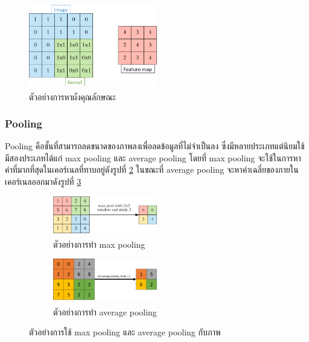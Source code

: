 \begin{figure}[!ht]
	\centering
	\includegraphics[width=0.5\textwidth]{chapter2/images/feature_map.png}
		\caption[ตัวอย่างการหาผังคุณลักษณะ]{ตัวอย่างการหาผังคุณลักษณะ\textsuperscript{\cite{cnn}}}
    	\label{fig:example feature map}
\end{figure}

\subsubsection{Pooling}
Pooling คือชั้นที่สามารถลดขนาดของภาพลงเพื่อลดข้อมูลที่ไม่จำเป็นลง ซึ่งมีหลายประเภทแต่นิยมใช้มีสองประเภทได้แก่ max pooling และ average pooling
โดยที่ max pooling จะใช้ในการหาค่าที่มากที่สุดในเคอร์เนลที่ทาบอยู่ดังรูปที่ \ref{fig:example max pooling} ในขณะที่ average pooling 
จะหาค่าเฉลี่ยของภายในเคอร์เนลออกมาดังรูปที่ \ref{fig:example average pooling}
\begin{figure}[!ht]
	\centering
	\begin{subfigure}[b]{1.0\textwidth}
		\centering
		\includegraphics[width=0.5\textwidth]{chapter2/images/max_pooling.png}
		\caption{ตัวอย่างการทำ max pooling\textsuperscript{\cite{cnn}}}
		\label{fig:example max pooling}
    \end{subfigure}
    \begin{subfigure}[b]{1.0\textwidth}
        \centering
		\includegraphics[width=0.5\textwidth]{chapter2/images/average_pooling.png}
		\caption{ตัวอย่างการทำ average pooling\textsuperscript{\cite{average_pooling}}}
		\label{fig:example average pooling}
	\end{subfigure}
	\caption{ตัวอย่างการใช้ max pooling และ average pooling กับภาพ}
	\label{fig:pooling_ex}
\end{figure}
\clearpage

